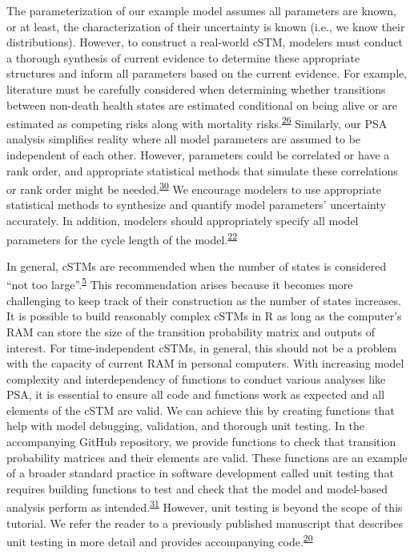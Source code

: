 \documentclass[
]{article}
\begin{document}
The parameterization of our example model assumes all parameters are known, or at least, the characterization of their uncertainty is known (i.e., we know their distributions). However, to construct a real-world cSTM, modelers must conduct a thorough synthesis of current evidence to determine these appropriate structures and inform all parameters based on the current evidence. For example, literature must be carefully considered when determining whether transitions between non-death health states are estimated conditional on being alive or are estimated as competing risks along with mortality risks.\textsuperscript{\protect\hyperlink{ref-Briggs2012}{26}} Similarly, our PSA analysis simplifies reality where all model parameters are assumed to be independent of each other. However, parameters could be correlated or have a rank order, and appropriate statistical methods that simulate these correlations or rank order might be needed.\textsuperscript{\protect\hyperlink{ref-Goldhaber-Fiebert2015}{30}} We encourage modelers to use appropriate statistical methods to synthesize and quantify model parameters' uncertainty accurately. In addition, modelers should appropriately specify all model parameters for the cycle length of the model.\textsuperscript{\protect\hyperlink{ref-Hunink2014}{22}}

In general, cSTMs are recommended when the number of states is considered ``not too large''.\textsuperscript{\protect\hyperlink{ref-Siebert2012c}{5}} This recommendation arises because it becomes more challenging to keep track of their construction as the number of states increases. It is possible to build reasonably complex cSTMs in R as long as the computer's RAM can store the size of the transition probability matrix and outputs of interest. For time-independent cSTMs, in general, this should not be a problem with the capacity of current RAM in personal computers. With increasing model complexity and interdependency of functions to conduct various analyses like PSA, it is essential to ensure all code and functions work as expected and all elements of the cSTM are valid. We can achieve this by creating functions that help with model debugging, validation, and thorough unit testing. In the accompanying GitHub repository, we provide functions to check that transition probability matrices and their elements are valid. These functions are an example of a broader standard practice in software development called unit testing that requires building functions to test and check that the model and model-based analysis perform as intended.\textsuperscript{\protect\hyperlink{ref-Wickham2021}{31}} However, unit testing is beyond the scope of this tutorial. We refer the reader to a previously published manuscript that describes unit testing in more detail and provides accompanying code.\textsuperscript{\protect\hyperlink{ref-Alarid-Escudero2019e}{20}}
\end{document}
